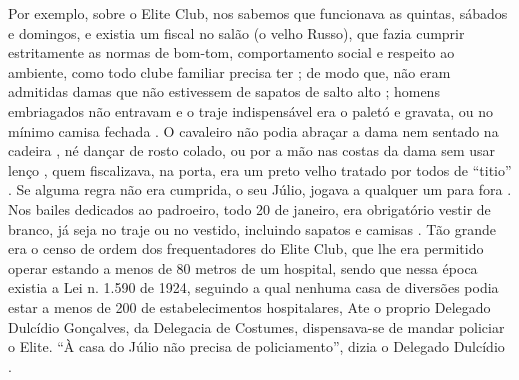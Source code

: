 Por exemplo, sobre o Elite Club,  nos sabemos que funcionava as quintas, sábados e domingos,
e existia um fiscal no salão (o velho Russo)\cite[pp. 37]{gafieirajournalmanchete}, 
que fazia cumprir estritamente as normas de bom-tom, comportamento social e respeito ao ambiente, como todo clube familiar precisa ter \cite[pp. 12]{respeitojournalbrasil1}; de modo que, 
não eram admitidas damas que não estivessem de sapatos de salto alto \cite[pp. 37]{gafieirajournalmanchete};
homens embriagados não entravam e o traje indispensável era o paletó e gravata, 
ou no mínimo camisa fechada \cite{entrevistajuliojournalbrasil1}.
O cavaleiro não podia abraçar a dama nem sentado na cadeira \cite{entrevistajuliojournalbrasil1},
né dançar de rosto colado, ou por a mão nas costas da dama sem usar lenço \cite[pp. 10]{simoesjournalbrasil1}, 
quem fiscalizava, na porta, era um preto velho tratado por todos de ``titio''  \cite[pp. 37]{gafieirajournalmanchete}.
Se alguma regra não era cumprida, o seu Júlio, jogava a qualquer um para fora \cite{entrevistajuliojournalbrasil1}.
Nos bailes dedicados ao padroeiro, todo 20 de janeiro, era obrigatório vestir de branco,
já seja no traje ou no vestido, incluindo sapatos e camisas \cite[pp. 37]{gafieirajournalmanchete}.
Tão grande era o censo de ordem dos frequentadores do Elite Club, 
que lhe era permitido operar estando a menos de 80 metros de um hospital,
sendo que nessa época existia a Lei n. 1.590 de 1924, 
seguindo a qual nenhuma casa de diversões podia estar a menos de 200 de estabelecimentos hospitalares,
Ate o proprio Delegado Dulcídio Gonçalves, da Delegacia de Costumes,
dispensava-se de mandar policiar o Elite.
``À casa do Júlio não precisa de policiamento'', dizia o Delegado Dulcídio
\cite[pp. 5]{simoesjournalalutademocratica1}.



